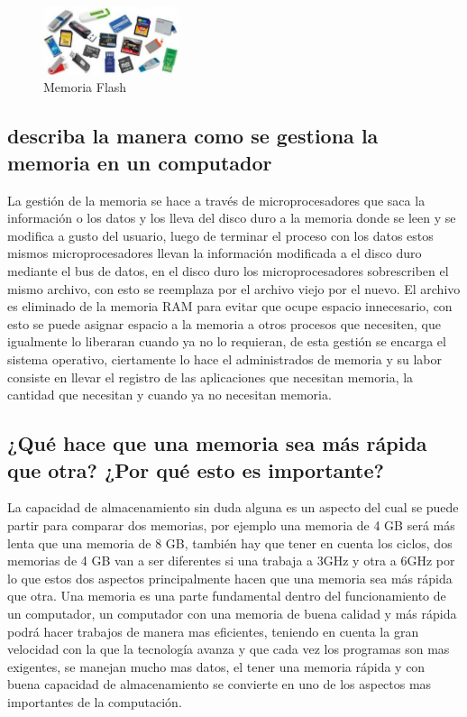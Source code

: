         \begin{figure}[h]
        \includegraphics[width=4cm]{flash.jpg}
        \centering
        \caption{Memoria Flash}
        \label{fig:flash}
        \end{figure}
    
    
    \subsection{describa la manera como se gestiona la memoria en un computador}
    La gestión de la memoria se hace a través de microprocesadores que saca la información o los datos y los lleva del disco duro a la memoria donde se  leen y se modifica a gusto del usuario, luego de terminar el proceso con los datos estos mismos microprocesadores llevan la información modificada a el disco duro mediante el bus de datos, en el disco duro los microprocesadores sobrescriben el mismo archivo, con esto se reemplaza por el archivo viejo por el nuevo. 
    El archivo es eliminado de la memoria RAM para evitar que ocupe espacio innecesario, con esto se puede asignar espacio a la memoria a otros procesos que necesiten, que igualmente lo liberaran cuando ya no lo requieran, de esta gestión se encarga el sistema operativo, ciertamente lo hace el administrados de memoria y su labor consiste en llevar el registro de las aplicaciones que necesitan memoria, la cantidad que necesitan y cuando ya no necesitan memoria.
 
    
    
    \subsection{¿Qué hace que una memoria sea más rápida que otra? ¿Por qué esto es importante?}
    La capacidad de almacenamiento sin duda alguna es un aspecto del cual se puede partir para comparar dos memorias, por ejemplo una memoria de 4 GB será más lenta que una memoria de 8 GB, también hay que tener en cuenta los ciclos, dos memorias de 4 GB van a ser diferentes si una trabaja a 3GHz y otra a 6GHz por lo que estos dos aspectos principalmente hacen que una memoria sea más rápida que otra. Una memoria es una parte fundamental dentro del funcionamiento de un computador, un computador con una memoria de buena calidad y más rápida podrá hacer trabajos de manera mas eficientes, teniendo en cuenta la gran velocidad con la que la tecnología avanza y que cada vez los programas son mas exigentes, se manejan mucho mas datos, el tener una memoria rápida y con buena capacidad de almacenamiento se convierte en uno de los aspectos mas importantes de la computación. 


